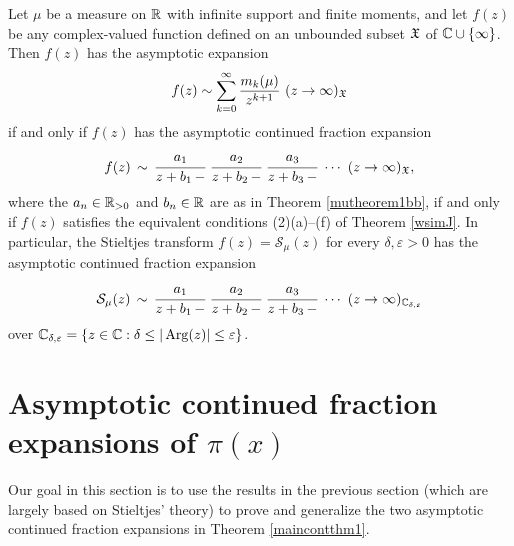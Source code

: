 \documentclass[12pt]{article}
\begin{document}
\begin{theorem}\label{mutheorem1cc}
Let $\mu$ be a measure on ${\mathbb R}$ with infinite support and finite moments, and let $f(z)$ be any complex-valued function defined on an unbounded subset ${\mathfrak X}$ of  ${\mathbb C} \cup \{\infty\}$.   Then $f(z)$ has the asymptotic expansion
$$f(z) \sim \sum_{k = 0}^\infty \frac{m_k(\mu)}{z^{k+1}} \ (z \to \infty)_{\mathfrak X}$$
if and only if $f(z)$ has the  asymptotic continued fraction expansion
$$f(z) \, \sim \,\cfrac{a_1}{z+b_1 \,-} \  \cfrac{a_2}{z+b_2 \,-} \  \cfrac{a_3}{z+b_3 \,-} \  \cdots  \ (z \to \infty)_{\mathfrak X},$$
where the $a_n \in {\mathbb R}_{> 0}$ and $b_n \in {\mathbb R}$ are as in Theorem \ref{mutheorem1bb}, if and only if $f(z)$ satisfies the equivalent conditions (2)(a)--(f) of Theorem \ref{wsimJ}.  In particular, the Stieltjes transform $f(z) = {\mathcal S}_\mu(z)$   for every $\delta, \varepsilon > 0$  has the asymptotic continued fraction expansion
$${\mathcal S}_\mu(z) \, \sim \, \cfrac{a_1}{z+b_1 \,-} \  \cfrac{a_2}{z+b_2 \,-} \  \cfrac{a_3}{z+b_3 \,-} \  \cdots  \ (z \to \infty)_{{\mathbb C}_{\delta, \varepsilon}}$$
over  ${\mathbb C}_{\delta, \varepsilon} = \{z \in {\mathbb C} : \delta \leq |\operatorname{Arg}(z)| \leq \varepsilon\}$.
\end{theorem}



\section{Asymptotic continued fraction expansions of $\pi(x)$}



Our goal in this section is to use the results in the previous section (which are largely based on Stieltjes' theory) to prove and generalize the two asymptotic continued fraction expansions in Theorem \ref{maincontthm1}.   
\end{document}
